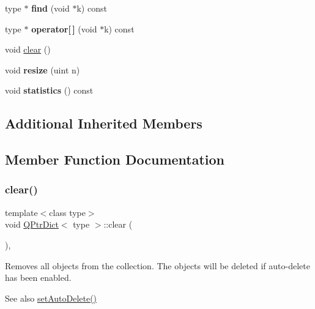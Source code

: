 \begin{DoxyCompactItemize}
\mbox{\label{class_q_ptr_dict_a926ba8f7e7514919fe3bb02c2169289f}} 
type $\ast$ {\bfseries find} (void $\ast$k) const
\item 
\mbox{\label{class_q_ptr_dict_a96d3aeab55108b4a51da015c457fc9f5}} 
type $\ast$ {\bfseries operator\mbox{[}$\,$\mbox{]}} (void $\ast$k) const
\item 
void \mbox{\hyperlink{class_q_ptr_dict_a26c647f903df9b82bc131b482f7d6900}{clear}} ()
\item 
\mbox{\label{class_q_ptr_dict_ae26fb686f3eb8d8f64b4e3ab2a7c7530}} 
void {\bfseries resize} (uint n)
\item 
\mbox{\label{class_q_ptr_dict_a7593a05bd320630b242180f396f72985}} 
void {\bfseries statistics} () const
\end{DoxyCompactItemize}
\subsection*{Additional Inherited Members}


\subsection{Member Function Documentation}
\mbox{\label{class_q_ptr_dict_a26c647f903df9b82bc131b482f7d6900}} 
\subsubsection{\texorpdfstring{clear()}{clear()}}
{\footnotesize\ttfamily template$<$class type$>$ \\
void \mbox{\hyperlink{class_q_ptr_dict}{Q\+Ptr\+Dict}}$<$ type $>$\+::clear (\begin{DoxyParamCaption}{ }\end{DoxyParamCaption})\hspace{0.3cm}{\ttfamily [inline]}, {\ttfamily [virtual]}}

Removes all objects from the collection. The objects will be deleted if auto-\/delete has been enabled. \begin{DoxySeeAlso}{See also}
\mbox{\hyperlink{class_q_collection_a6ed41913c76bfba54be6da26015ee3f3}{set\+Auto\+Delete()}} 
\end{DoxySeeAlso}


